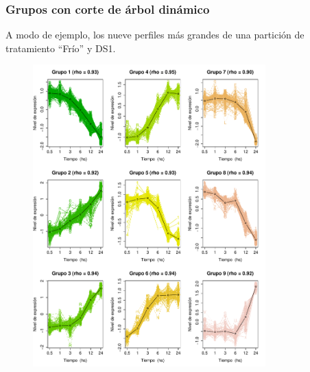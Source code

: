 \documentclass[serif,9pt, t]{beamer}
\begin{document}
\begin{frame}\frametitle{Grupos con corte de árbol dinámico} 
\centering
A modo de ejemplo, los nueve perfiles más grandes de una partición de tratamiento ``Frío'' y DS1.\\
\begin{figure}
\centering
\includegraphics[width=0.8\textwidth, height=0.8\textheight]{perfiles_ds_1.pdf}	
\end{figure}
\end{frame}


\end{document}
